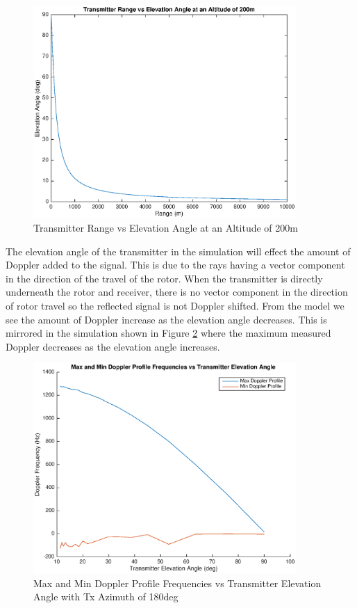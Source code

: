 \begin{figure}
	\begin{center}
		\includegraphics[width=10cm]{images/simulation/range_elevation_rel.eps}
		\caption{Transmitter Range vs Elevation Angle at an Altitude of 200m}
		\label{fig:tx_range_elevation_rel}
	\end{center}
\end{figure}

The elevation angle of the transmitter in the simulation will effect the amount of Doppler added to the signal. This is due to the rays having a vector component in the direction of the travel of the rotor. When the transmitter is directly underneath the rotor and receiver, there is no vector component in the direction of rotor travel so the reflected signal is not Doppler shifted. From the model we see the amount of Doppler increase as the elevation angle decreases. This is mirrored in the simulation shown in Figure \ref{fig:tx_elevation_180deg} where the maximum measured Doppler decreases as the elevation angle increases.

 \begin{figure}
	\begin{center}
		\includegraphics[width=10cm]{images/simulation/elevation_angle_max_doppler_180deg.eps}
		\caption{Max and Min Doppler Profile Frequencies vs Transmitter Elevation Angle with Tx Azimuth of 180deg}
		\label{fig:tx_elevation_180deg}
	\end{center}
\end{figure}


